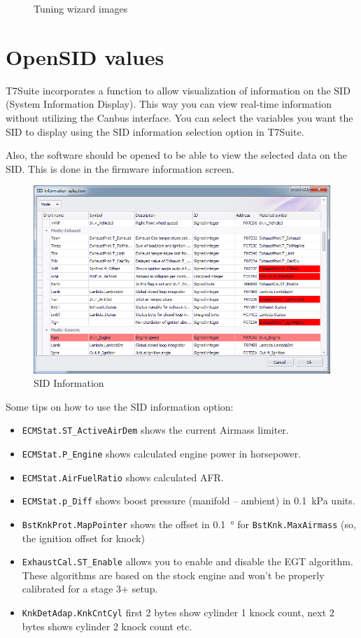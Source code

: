 \documentclass[11pt,a4paper]{book}
\newcommand{\Mfig}[1]{%
\begin{figure}
    \centering
    \missingfigure{#1}
    \caption{#1}
\end{figure}}
\begin{document}
\Mfig{Tuning wizard images}

\chapter{OpenSID values}
T7Suite incorporates a function to allow visualization of information on the SID
(System Information Display). This way you can view real-time information
without utilizing the Canbus interface. You can select the variables you want
the SID to display using the SID information selection option in T7Suite.

Also, the software should be opened to be able to view the selected data on the
SID. This is done in the firmware information screen.
\begin{figure}
    \centering
    \includegraphics[width=.9\linewidth]{sid.png}
    \caption{SID Information}
    \label{fig:}
\end{figure}

Some tips on how to use the SID information option:
\begin{itemize}
    \item
        \texttt{ECMStat.ST\_ActiveAirDem} shows the current Airmass limiter.
    \item
        \texttt{ECMStat.P\_Engine} shows calculated engine power in horsepower.
    \item
        \texttt{ECMStat.AirFuelRatio} shows calculated AFR.
    \item
        \texttt{ECMStat.p\_Diff} shows boost pressure (manifold – ambient) in
        \SI{0.1}{\kilo\pascal} units.
    \item
        \texttt{BstKnkProt.MapPointer} shows the offset in \SI{0.1}{\degree} for
        \texttt{BstKnk.MaxAirmass} (so, the
        ignition offset for knock)
    \item
        \texttt{ExhaustCal.ST\_Enable} allows you to enable and disable the EGT
        algorithm. These algorithms are based on the stock engine and won’t be
        properly calibrated for a stage 3+ setup.
    \item
        \texttt{KnkDetAdap.KnkCntCyl} first 2 bytes show cylinder 1 knock count,
        next 2 bytes shows cylinder 2 knock count etc.
\end{itemize}
\end{document}
